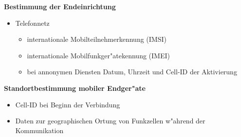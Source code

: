     \begin{frame}
      \textbf{Bestimmung der Endeinrichtung}
      \begin{itemize}
        \item Telefonnetz
        \begin{itemize}
          \item internationale Mobilteilnehmerkennung (IMSI)
          \item internationale Mobilfunkger"atekennung (IMEI)
          \item bei annonymen Diensten Datum, Uhrzeit und Cell-ID der Aktivierung
        \end{itemize}
      \end{itemize}
    \end{frame}

    \begin{frame}
      \textbf{Standortbestimmung mobiler Endger"ate}
      \begin{itemize}
        \item Cell-ID bei Beginn der Verbindung
        \item Daten zur geographischen Ortung von Funkzellen w"ahrend der Kommunikation
      \end{itemize}
    \end{frame}
